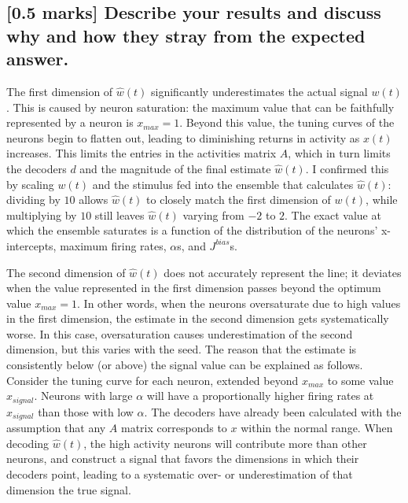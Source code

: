 \documentclass{article}
\begin{document}
\subsection{{[}0.5 marks{]} Describe your results and discuss why and how they stray from the expected answer.}

The first dimension of $\hat{w}(t)$ significantly underestimates the
actual signal $w(t)$. This is caused by neuron saturation: the maximum
value that can be faithfully represented by a neuron is $x_{max}=1$.
Beyond this value, the tuning curves of the neurons begin to flatten
out, leading to diminishing returns in activity as $x(t)$ increases.
This limits the entries in the activities matrix $A$, which in turn
limits the decoders $d$ and the magnitude of the final estimate
$\hat{w}(t)$. I confirmed this by scaling $w(t)$ and the stimulus fed
into the ensemble that calculates $\hat{w}(t)$: dividing by $10$ allows
$\hat{w}(t)$ to closely match the first dimension of $w(t)$, while
multiplying by $10$ still leaves $\hat{w}(t)$ varying from $-2$ to $2$.
The exact value at which the ensemble saturates is a function of the
distribution of the neurons' x-intercepts, maximum firing rates,
$\alpha$s, and $J^{bias}$s.

The second dimension of $\hat{w}(t)$ does not accurately represent the
line; it deviates when the value represented in the first dimension
passes beyond the optimum value $x_{max}=1$. In other words, when the
neurons oversaturate due to high values in the first dimension, the
estimate in the second dimension gets systematically worse. In this
case, oversaturation causes underestimation of the second dimension, but
this varies with the seed. The reason that the estimate is consistently
below (or above) the signal value can be explained as follows. Consider
the tuning curve for each neuron, extended beyond $x_{max}$ to some
value $x_{signal}$. Neurons with large $\alpha$ will have a
proportionally higher firing rates at $x_{signal}$ than those with low
$\alpha$. The decoders have already been calculated with the assumption
that any $A$ matrix corresponds to $x$ within the normal range. When
decoding $\hat{w}(t)$, the high activity neurons will contribute more
than other neurons, and construct a signal that favors the dimensions in
which their decoders point, leading to a systematic over- or
underestimation of that dimension the true signal.
\end{document}
